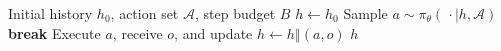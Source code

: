 \begin{algorithm}[htbp]
\caption{Illustrative interaction loop for \ourmethod{}}
\label{alg:agent}
\begin{algorithmic}[1]
  \Require Initial history $h_0$, action set $\mathcal{A}$, step budget $B$
  \State $h\gets h_0$
    \State Sample $a\sim\pi_\theta(\,\cdot\mid h,\mathcal{A})$
     \State \textbf{break} \EndIf
    \State Execute $a$, receive $o$, and update $h\gets h\mathbin{\Vert}(a,o)$
  \EndFor
  \State \Return $h$
\end{algorithmic}
\end{algorithm}
